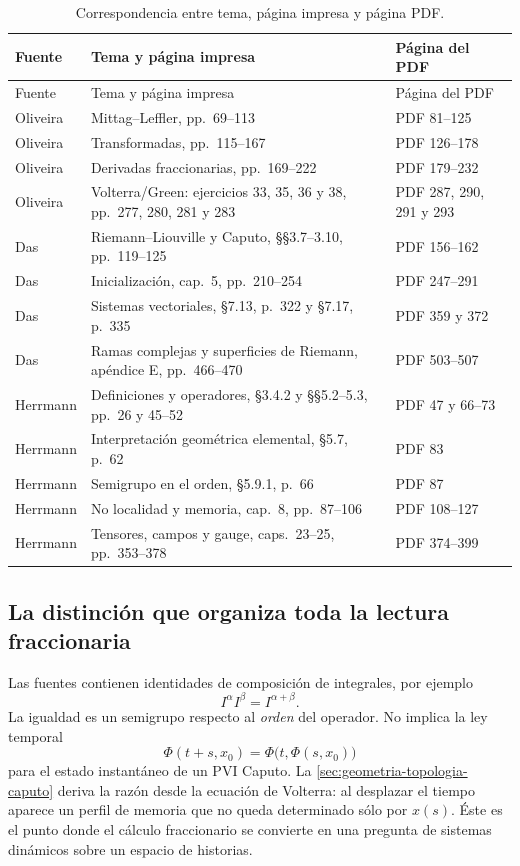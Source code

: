 \begin{longtable}{@{}L{0.21\textwidth}L{0.35\textwidth}L{0.35\textwidth}@{}}
\caption{Correspondencia entre tema, página impresa y página PDF.}
\label{tab:ruta-frac-pdf-pages}\\
\toprule
Fuente & Tema y página impresa & Página del PDF \\
\midrule
\endfirsthead
\toprule
Fuente & Tema y página impresa & Página del PDF \\
\midrule
\endhead
Oliveira & Mittag--Leffler, pp.\ 69--113 & PDF 81--125 \\
Oliveira & Transformadas, pp.\ 115--167 & PDF 126--178 \\
Oliveira & Derivadas fraccionarias, pp.\ 169--222 & PDF 179--232 \\
Oliveira & Volterra/Green: ejercicios 33, 35, 36 y 38,
pp.\ 277, 280, 281 y 283 & PDF 287, 290, 291 y 293 \\
Das & Riemann--Liouville y Caputo, \S\S3.7--3.10,
pp.\ 119--125 & PDF 156--162 \\
Das & Inicialización, cap.\ 5, pp.\ 210--254 & PDF 247--291 \\
Das & Sistemas vectoriales, \S7.13, p.\ 322 y \S7.17, p.\ 335 &
PDF 359 y 372 \\
Das & Ramas complejas y superficies de Riemann, apéndice E,
pp.\ 466--470 & PDF 503--507 \\
Herrmann & Definiciones y operadores, \S3.4.2 y \S\S5.2--5.3,
pp.\ 26 y 45--52 & PDF 47 y 66--73 \\
Herrmann & Interpretación geométrica elemental, \S5.7, p.\ 62 & PDF 83 \\
Herrmann & Semigrupo en el orden, \S5.9.1, p.\ 66 & PDF 87 \\
Herrmann & No localidad y memoria, cap.\ 8, pp.\ 87--106 & PDF 108--127 \\
Herrmann & Tensores, campos y gauge, caps.\ 23--25,
pp.\ 353--378 & PDF 374--399 \\
\bottomrule
\end{longtable}

\subsection{La distinción que organiza toda la lectura fraccionaria}

Las fuentes contienen identidades de composición de integrales, por ejemplo
\begin{equation}
 I^\alpha I^\beta=I^{\alpha+\beta}.
 \label{eq:library-order-semigroup}
\end{equation}
La igualdad es un semigrupo respecto al \emph{orden} del operador. No implica
la ley temporal
\begin{equation}
 \Phi(t+s,x_0)=\Phi\bigl(t,\Phi(s,x_0)\bigr)
 \label{eq:library-false-time-semigroup}
\end{equation}
para el estado instantáneo de un PVI Caputo. La
\cref{sec:geometria-topologia-caputo} deriva la razón desde la ecuación de
Volterra: al desplazar el tiempo aparece un perfil de memoria que no queda
determinado sólo por \(x(s)\). Éste es el punto donde el cálculo fraccionario
se convierte en una pregunta de sistemas dinámicos sobre un espacio de
historias.

